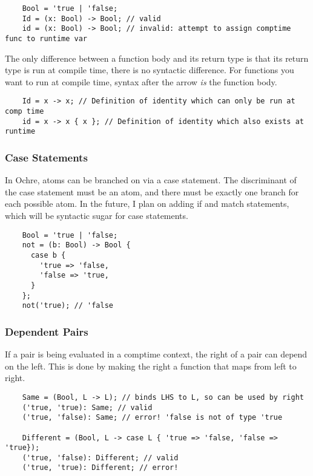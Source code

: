 \documentclass[12pt,twoside]{report}
\begin{document}
\begin{listing}[H]
  \begin{verbatim}
    Bool = 'true | 'false;
    Id = (x: Bool) -> Bool; // valid
    id = (x: Bool) -> Bool; // invalid: attempt to assign comptime func to runtime var
  \end{verbatim}
\end{listing}

The only difference between a function body and its return type is that its return type is run at compile time, there is no syntactic difference. For functions you want to run at compile time, syntax after the arrow \textit{is} the function body.

  \begin{verbatim}
    Id = x -> x; // Definition of identity which can only be run at comp time
    id = x -> x { x }; // Definition of identity which also exists at runtime
  \end{verbatim}

\subsubsection{Case Statements}
In Ochre, atoms can be branched on via a case statement. The discriminant of the case statement must be an atom, and there must be exactly one branch for each possible atom. In the future, I plan on adding if and match statements, which will be syntactic sugar for case statements.

  \begin{verbatim}
    Bool = 'true | 'false;
    not = (b: Bool) -> Bool {
      case b {
        'true => 'false,
        'false => 'true,
      }
    };
    not('true); // 'false
  \end{verbatim}

\subsubsection{Dependent Pairs}
If a pair is being evaluated in a comptime context, the right of a pair can depend on the left. This is done by making the right a function that maps from left to right.

  \begin{verbatim}
    Same = (Bool, L -> L); // binds LHS to L, so can be used by right
    ('true, 'true): Same; // valid
    ('true, 'false): Same; // error! 'false is not of type 'true

    Different = (Bool, L -> case L { 'true => 'false, 'false => 'true});
    ('true, 'false): Different; // valid
    ('true, 'true): Different; // error!
  \end{verbatim}
\end{document}
